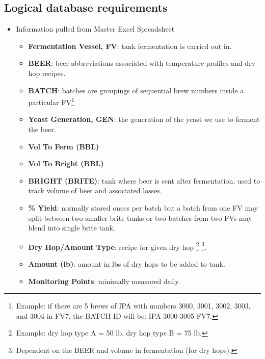 \documentclass[draftclsnofoot,onecolumn,letterpaper,10pt,compsoc]{IEEEtran}
\begin{document}
	\subsection{Logical database requirements}
    \begin{itemize}
        \item{Information pulled from Master Excel Spreadsheet}
            \begin{itemize}
                \item{\textbf{Fermentation Vessel, FV}:
                    tank fermentation is carried out in.
                }
                \item{\textbf{BEER}:
                    beer abbreviations associated with temperature profiles and dry hop recipes.
                }
                \item{\textbf{BATCH}:
                    batches are groupings of sequential brew numbers inside a particular FV\footnote{Example: if there are 5 brews of IPA with numbers 3000, 3001, 3002, 3003, and 3004 in FV7, the BATCH ID will be: IPA 3000-3005 FV7.}
                }
                \item{\textbf{Yeast Generation, GEN}:
				    the generation of the yeast we use to ferment the beer.
                }
                \item{\textbf{Vol To Ferm (BBL)}}
                \item{\textbf{Vol To Bright (BBL)}}
                \item{\textbf{BRIGHT (BRITE)}:
                    tank where beer is sent after fermentation, used to track volume of beer and associated losses.
                }
                \item{\textbf{\% Yield}:
                    normally stored onces per batch but a batch from one FV may split between two smaller brite tanks or two batches from two FVs may blend into single brite tank.
                }
                \item{\textbf{Dry Hop/Amount Type}:
                    recipe for given dry hop
                    \footnote{Example: dry hop type A = 50 lb, dry hop type B = 75 lb.}
                    \footnote{Dependent on the BEER and volume in fermentation (for dry hops).}.
                }
                \item{\textbf{Amount (lb)}:
                    amount in lbs of dry hops to be added to tank.
                }
                \item{\textbf{Monitoring Points}:
                    minimally measured daily.
}
\end{itemize}
\end{itemize}
\end{document}

